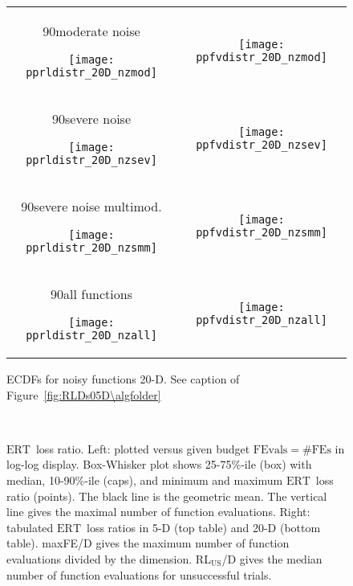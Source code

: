 \documentclass{article}
\newcommand{\ERT}{\ensuremath{\mathrm{ERT}}}
\newcommand{\FEvals}{\ensuremath{\mathrm{FEvals}}}
\newcommand{\nbFEs}{\ensuremath{\mathrm{\#FEs}}}
\newcommand{\rot}[2][2.5]{
  \hspace*{-3.5\baselineskip}%
  \begin{rotate}{90}\hspace{#1em}#2
  \end{rotate}}
\newcommand{\bbobdatapath}{ppdata/} %
\begin{document}
\begin{figure}[htbp!]
\centering
\begin{tabular}{@{}c@{}c@{}}
\rot[2.]{moderate noise}
\texttt{[image: pprldistr\_20D\_nzmod]} &
\texttt{[image: ppfvdistr\_20D\_nzmod]}
\\[-1ex]
\rot[2.8]{severe noise}
\texttt{[image: pprldistr\_20D\_nzsev]} &
\texttt{[image: ppfvdistr\_20D\_nzsev]}
\\[-1ex]
\rot[0.6]{severe noise multimod.}
\texttt{[image: pprldistr\_20D\_nzsmm]} &
\texttt{[image: ppfvdistr\_20D\_nzsmm]}\\[-1ex]
\rot[2.8]{all functions}
\texttt{[image: pprldistr\_20D\_nzall]} &
\texttt{[image: ppfvdistr\_20D\_nzall]}
\end{tabular}
\vspace*{-2ex}
\caption{\label{fig:RLDs20D\algfolder}ECDFs for noisy functions 20-D. See caption of
Figure~\ref{fig:RLDs05D\algfolder}}
\end{figure}
\begin{figure}[htbp!]
\subfloat{
\centering
\scriptsize
}\\[-2ex]
\subfloat{
\centering
\scriptsize
}
\caption{\label{fig:ERTloglossa\algfolder}
\ERT\ loss ratio. Left: plotted versus given budget
$\FEvals=\nbFEs$ in log-log display. Box-Whisker plot shows 25-75\%-ile (box)
with median, 10-90\%-ile (caps), and minimum and maximum \ERT\ loss ratio
(points). The black line is the geometric mean. The vertical line gives the
maximal number of function evaluations. Right: tabulated \ERT\ loss ratios
in 5-D (top table) and 20-D (bottom table). maxFE/D gives the maximum number of
function evaluations divided by the dimension. RL$_{\text{US}}$/D gives the
median number of function evaluations for unsuccessful trials.}
\end{figure}
\end{document}
